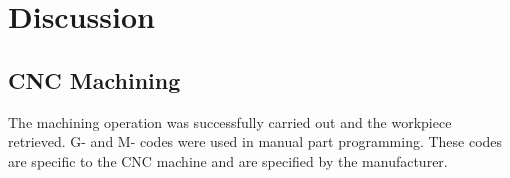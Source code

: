\section{Discussion}
\subsection{CNC Machining}
The machining operation was successfully carried out and the workpiece retrieved. G- and M- codes were used in manual part programming. These codes are specific to the CNC machine and are specified by the manufacturer.